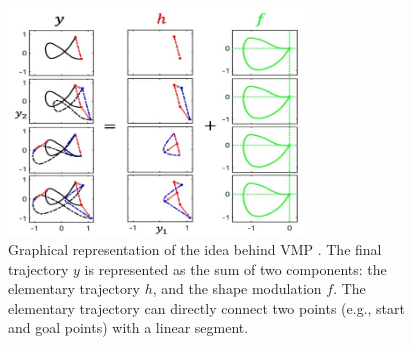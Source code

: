 \begin{figure}[t]
    \centering
    \includegraphics[width=0.7\textwidth]{figures/images/vmp/vmp.jpg}
    \caption{Graphical representation of the idea behind VMP \cite{zhou2019learning}. The final trajectory \( y \) is represented as the sum of two components: the elementary trajectory \( h \), and the shape modulation \( f \). The elementary trajectory can directly connect two points (e.g., start and goal points) with a linear segment.}
    \label{fig:vmp}
\end{figure}
